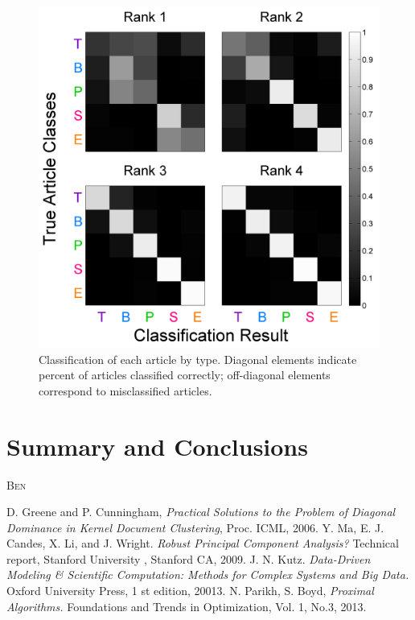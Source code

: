 \documentclass[12pt]{article}
\newcommand{\comment}[1]{\textsc{\color[rgb]{1,0,0}#1}}
\begin{document}
\begin{figure}[H]
\centering
\includegraphics[scale=.3]{figures/classificationmatrices}
\caption{Classification of each article by type. Diagonal elements indicate percent of articles classified correctly; off-diagonal
elements correspond to misclassified articles.}
\label{misclassification}
\end{figure}

\section{Summary and Conclusions}
\comment{Ben}

\begin{thebibliography}{4}
 D. Greene and P. Cunningham, \emph{Practical Solutions to the Problem of Diagonal Dominance in Kernel Document Clustering}, Proc. ICML, 2006.
 Y. Ma, E. J. Candes, X. Li, and J. Wright. \emph{Robust Principal Component Analysis?} Technical report, Stanford University , Stanford CA, 2009.
 J. N. Kutz. \emph{Data-Driven Modeling \& Scientific Computation: Methods for Complex Systems and Big Data.} Oxford University Press, 1 st edition, 20013.
 N. Parikh, S. Boyd, \emph{Proximal Algorithms.} Foundations and Trends in Optimization, Vol. 1, No.3, 2013.
\end{thebibliography}
\end{document}
